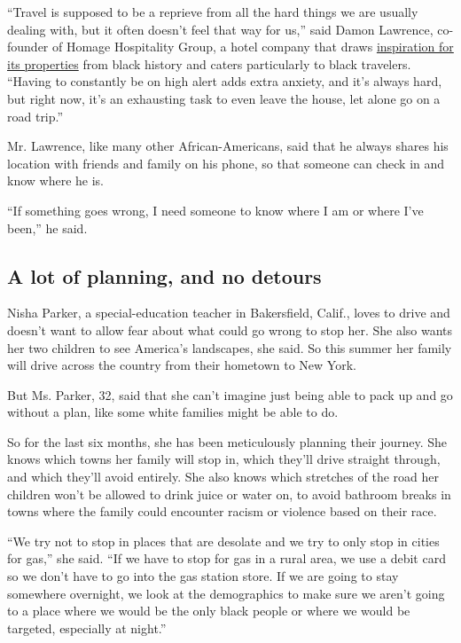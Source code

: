 ``Travel is supposed to be a reprieve from all the hard things we are
usually dealing with, but it often doesn't feel that way for us,'' said
Damon Lawrence, co-founder of Homage Hospitality Group, a hotel company
that draws \href{http://www.stayhomage.com/themoor}{inspiration for its
properties} from black history and caters particularly to black
travelers. ``Having to constantly be on high alert adds extra anxiety,
and it's always hard, but right now, it's an exhausting task to even
leave the house, let alone go on a road trip.''

Mr. Lawrence, like many other African-Americans, said that he always
shares his location with friends and family on his phone, so that
someone can check in and know where he is.

``If something goes wrong, I need someone to know where I am or where
I've been,'' he said.

\hypertarget{a-lot-of-planning-and-no-detours}{%
\subsection{A lot of planning, and no
detours}\label{a-lot-of-planning-and-no-detours}}

Nisha Parker, a special-education teacher in Bakersfield, Calif., loves
to drive and doesn't want to allow fear about what could go wrong to
stop her. She also wants her two children to see America's landscapes,
she said. So this summer her family will drive across the country from
their hometown to New York.

But Ms. Parker, 32, said that she can't imagine just being able to pack
up and go without a plan, like some white families might be able to do.

So for the last six months, she has been meticulously planning their
journey. She knows which towns her family will stop in, which they'll
drive straight through, and which they'll avoid entirely. She also knows
which stretches of the road her children won't be allowed to drink juice
or water on, to avoid bathroom breaks in towns where the family could
encounter racism or violence based on their race.

``We try not to stop in places that are desolate and we try to only stop
in cities for gas,'' she said. ``If we have to stop for gas in a rural
area, we use a debit card so we don't have to go into the gas station
store. If we are going to stay somewhere overnight, we look at the
demographics to make sure we aren't going to a place where we would be
the only black people or where we would be targeted, especially at
night.''

